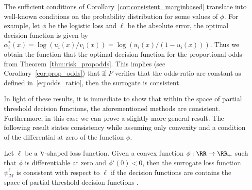 The sufficient conditions of Corollary~\ref{cor:consistent_marginbased} translate into well-known conditions on the probability distribution for some values of $\phi$. For example, let $\phi$ be the logistic loss and $\ell$ be the absolute error, the optimal decision function is given by $\alpha_i^*(x) = \log(u_i(x) / v_i(x)) = \log(u_i(x) / (1 - u_i(x)))$. Thus we obtain the function that the optimal decision function for the proportional odds from Theorem~\ref{thm:risk_propodds}. This implies (see Corollary~\ref{cor:prop_odds}) that if $P$ verifies that the odds-ratio are constant as defined in~\eqref{eq:odds_ratio}, then the surrogate is consistent.




In light of these results, it is immediate to show that within the space of partial threshold decision functions, the aforementioned methods are consistent. Furthermore, in this case we can prove a slightly more general result. The following result states consistency while assuming only convexity and a condition of the differential at zero of the function $\phi$.


\begin{theorem}\label{thm:consistent_V_shaped}
Let $\ell$ be a V-shaped loss function. Given a convex function ${\phi: \RR \rightarrow \RR_+}$ such that $\phi$ is differentiable at zero and $\phi'(0) < 0$, then the surrogate loss function $\psi_{\mathcal{M}}^{\ell}$
is consistent with respect to $\ell$ if the decision functions are contains the space of partial-threshold decision functions .
\end{theorem}


